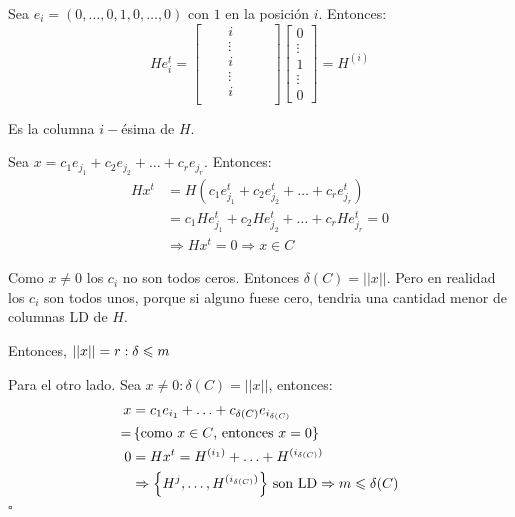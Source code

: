 \documentclass[12pt,a4paper]{article}
\begin{document}
Sea $e_{i} = (0,\ldots,0,1,0,\ldots,0)$ con $1$ en la posición $i$. Entonces:
\begin{equation*}
    He_{i}^{t} =
    \begin{bmatrix}
        &   & i      &   &   & \\
        &   & \vdots &   &   & \\
        &   & i      &   &   & \\
        &   & \vdots &   &   & \\
        &   & i      &   &   & \\
    \end{bmatrix}
    \begin{bmatrix}
        0\\
        \vdots\\
        1\\
        \vdots\\
        0
    \end{bmatrix}
    =
    H^{(i)}
\end{equation*}

Es la columna $i-$ésima de $H$.
\medskip

Sea $x = c_{1}e_{j_{1}}+c_{2}e_{j_{2}}+\ldots + c_{r}e_{j_{r}}$. Entonces:
\begin{align*}
    Hx^{t} &= H(c_{1}e_{j_{1}}^{t}+c_{2}e_{j_{2}}^{t}+\ldots + c_{r}e_{j_{r}}^{t})\\
    &= c_{1}He_{j_{1}}^{t}+c_{2}He_{j_{2}}^{t}+\ldots + c_{r}He_{j_{r}}^{t} = 0\\
    &\Rightarrow Hx^{t} = 0 \Rightarrow x\in C
\end{align*}

Como $x \neq 0$ los $c_{i}$ no son todos ceros. Entonces $\delta(C) = ||x||$. 
Pero en realidad los $c_{i}$ son todos unos, porque si alguno fuese cero, tendria 
una cantidad menor de columnas LD de $H$.
\medskip

Entonces, $||x|| = r : \delta \leqslant m$
\medskip

Para el otro lado. Sea $x\neq 0 : \delta(C) = ||x||$, entonces:
\begin{align*}
    x &= c_{1}e_{i_{1}} + \ldots + c_{\delta(C)}e_{i_{\delta(C)}}\\
    =&\left\lbrace \text{como $x\in C$, entonces $x=0$} \right\rbrace\\
    0 &= Hx^{t} = H^{(i_{1})} + \ldots + H^{(i_{\delta(C)})}\\
    &\Rightarrow \left\lbrace H^{j},\ldots, H^{(i_{\delta(C)})} \right\rbrace\,\text{son LD} \Rightarrow m \leqslant \delta(C)
\end{align*} $\square$
\end{document}

